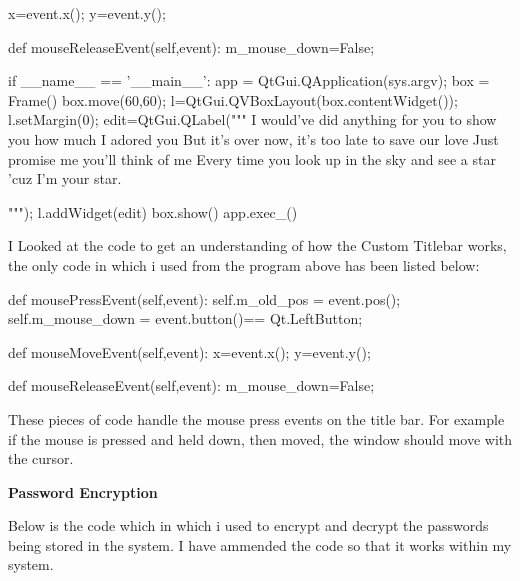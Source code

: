 {\begin{python}
        x=event.x();
        y=event.y();

    def mouseReleaseEvent(self,event):
        m_mouse_down=False;




if __name__ == '__main__':
    app = QtGui.QApplication(sys.argv);
    box = Frame()
    box.move(60,60);
    l=QtGui.QVBoxLayout(box.contentWidget());
    l.setMargin(0);
    edit=QtGui.QLabel("""
I would've did anything for you to show you how much I adored you
But it's over now, it's too late to save our love
Just promise me you'll think of me
Every time you look up in the sky and see a star 'cuz I'm  your star.

                          """);
    l.addWidget(edit)
    box.show()
    app.exec_()

\end{python}
}

I Looked at the code to get an understanding of how the Custom Titlebar works, the only code in which i used from the program above has been listed below:

{\scriptsize
\begin{python}

def mousePressEvent(self,event):
        self.m_old_pos = event.pos();
        self.m_mouse_down = event.button()== Qt.LeftButton;
   
def mouseMoveEvent(self,event):
        x=event.x();
        y=event.y();
        
def mouseReleaseEvent(self,event):
        m_mouse_down=False;

\end{python}
}

These pieces of code handle the mouse press events on the title bar. For example if the mouse is pressed and held down, then moved, the window should move with the cursor.

\textbf{Password Encryption}

Below is the code which in which i used to encrypt and decrypt the passwords being stored in the system. I have ammended the code so that it works within my system.

